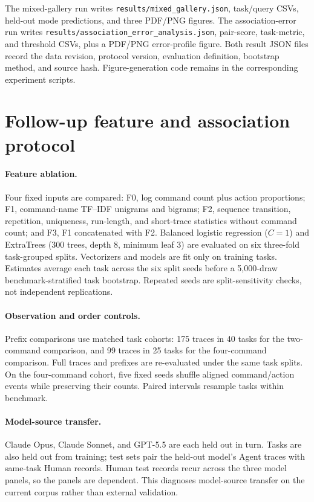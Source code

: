 The mixed-gallery run writes \texttt{results/mixed\_gallery.json}, task/query CSVs, held-out mode predictions, and three PDF/PNG figures. The association-error run writes \texttt{results/association\_error\_analysis.json}, pair-score, task-metric, and threshold CSVs, plus a PDF/PNG error-profile figure. Both result JSON files record the data revision, protocol version, evaluation definition, bootstrap method, and source hash. Figure-generation code remains in the corresponding experiment scripts.

\section{Follow-up feature and association protocol}

\paragraph{Feature ablation.} Four fixed inputs are compared: F0, log command count plus action proportions; F1, command-name TF--IDF unigrams and bigrams; F2, sequence transition, repetition, uniqueness, run-length, and short-trace statistics without command count; and F3, F1 concatenated with F2. Balanced logistic regression ($C=1$) and ExtraTrees (300 trees, depth 8, minimum leaf 3) are evaluated on six three-fold task-grouped splits. Vectorizers and models are fit only on training tasks. Estimates average each task across the six split seeds before a 5,000-draw benchmark-stratified task bootstrap. Repeated seeds are split-sensitivity checks, not independent replications.

\paragraph{Observation and order controls.} Prefix comparisons use matched task cohorts: 175 traces in 40 tasks for the two-command comparison, and 99 traces in 25 tasks for the four-command comparison. Full traces and prefixes are re-evaluated under the same task splits. On the four-command cohort, five fixed seeds shuffle aligned command/action events while preserving their counts. Paired intervals resample tasks within benchmark.

\paragraph{Model-source transfer.} Claude Opus, Claude Sonnet, and GPT-5.5 are each held out in turn. Tasks are also held out from training; test sets pair the held-out model's Agent traces with same-task Human records. Human test records recur across the three model panels, so the panels are dependent. This diagnoses model-source transfer on the current corpus rather than external validation.

